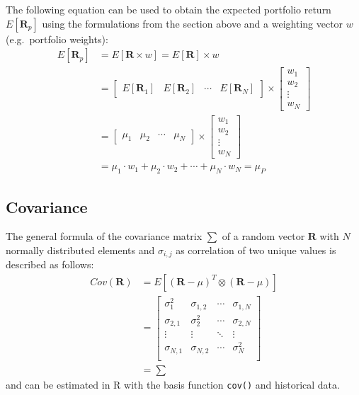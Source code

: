 \documentclass[
  oneside]{book}
\begin{document}
The following equation can be used to obtain the expected portfolio return \(E[\pmb{R}_p]\) using the formulations from the section above and a weighting vector \(w\) (e.g.~portfolio weights):
\begin{align*}
E[\pmb{R}_p] &=
 E[\pmb{R} \times w] = 
 E[\pmb{R}] \times w \\
 &= 
  \begin{bmatrix}
    E[\pmb{R}_{1}] & E[\pmb{R}_{2}] & \cdots & E[\pmb{R}_{N}]
 \end{bmatrix}
  \times 
  \begin{bmatrix}
    w_{1} \\ 
    w_{2} \\
    \vdots \\
    w_{N}  
 \end{bmatrix} \\
 &=
   \begin{bmatrix}
    \mu_{1} & \mu_{2} & \cdots & \mu_{N}
 \end{bmatrix}
  \times 
  \begin{bmatrix}
    w_{1} \\ 
    w_{2} \\
    \vdots \\
    w_{N}  
 \end{bmatrix} \\
 &=
 \mu_{1} \cdot w_1 + \mu_{2} \cdot w_2 + \cdots + \mu_{N} \cdot w_{N} 
 =
 \mu_P
\end{align*}

\hypertarget{covariance}{%
\subsection{Covariance}\label{covariance}}

The general formula of the covariance matrix \(\textstyle\sum\) of a random vector \(\pmb{R}\) with \(N\) normally distributed elements and \(\sigma_{i,j}\) as correlation of two unique values is described as follows:
\begin{align*}
  Cov(\pmb{R}) &= E[(\pmb{R}-\mu)^T \otimes (\pmb{R}-\mu)] \\
  &=   \begin{bmatrix}
    \sigma_1^2 & \sigma_{1,2} & \cdots & \sigma_{1,N} \\
    \sigma_{2, 1} & \sigma_2^2 & \cdots & \sigma_{2, N} \\
    \vdots  & \vdots & \ddots & \vdots \\
    \sigma_{N, 1} & \sigma_{N, 2} & \cdots & \sigma_N^2 \\
 \end{bmatrix}\\
  &=\textstyle\sum
\end{align*}
and can be estimated in R with the basis function \texttt{cov()} and historical data.
\end{document}
